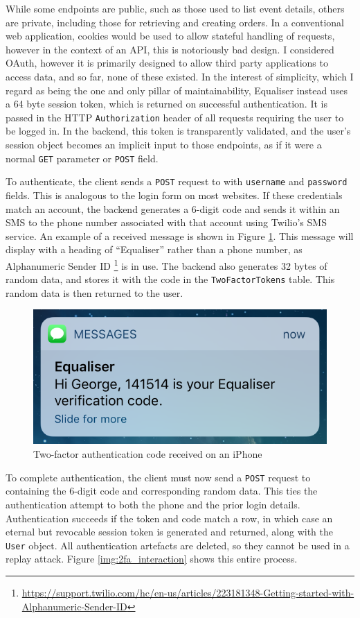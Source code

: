 \documentclass[12pt,a4paper]{bhamdissertation}
\newcommand{\code}[1]{\texttt{#1}}
\begin{document}
While some endpoints are public, such as those used to list event details, others are private, including those for retrieving and creating orders. In a conventional web application, cookies would be used to allow stateful handling of requests, however in the context of an API, this is notoriously bad design. I considered OAuth, however it is primarily designed to allow third party applications to access data, and so far, none of these existed. In the interest of simplicity, which I regard as being the one and only pillar of maintainability, Equaliser instead uses a 64 byte session token, which is returned on successful authentication. It is passed in the HTTP \code{Authorization} header of all requests requiring the user to be logged in. In the backend, this token is transparently validated, and the user's session object becomes an implicit input to those endpoints, as if it were a normal \code{GET} parameter or \code{POST} field.

To authenticate, the client sends a \code{POST} request to \code{} with \code{username} and \code{password} fields. This is analogous to the login form on most websites. If these credentials match an account, the backend generates a 6-digit code and sends it within an SMS to the phone number associated with that account using Twilio's SMS service. An example of a received message is shown in Figure \ref{img:2fa_code}. This message will display with a heading of ``Equaliser'' rather than a phone number, as Alphanumeric Sender ID \footnote{\url{https://support.twilio.com/hc/en-us/articles/223181348-Getting-started-with-Alphanumeric-Sender-ID}} is in use. The backend also generates 32 bytes of random data, and stores it with the code in the \code{TwoFactorTokens} table. This random data is then returned to the user.

\begin{figure}[!htbp]
    \centering
    \includegraphics[width=.5\linewidth]{img/2fa_code.png}
    \caption{Two-factor authentication code received on an iPhone}
    \label{img:2fa_code}
\end{figure}

To complete authentication, the client must now send a \code{POST} request to \code{} containing the 6-digit code and corresponding random data. This ties the authentication attempt to both the phone and the prior login details. Authentication succeeds if the token and code match a row, in which case an eternal but revocable session token is generated and returned, along with the \code{User} object. All authentication artefacts are deleted, so they cannot be used in a replay attack. Figure \ref{img:2fa_interaction} shows this entire process.
\end{document}

